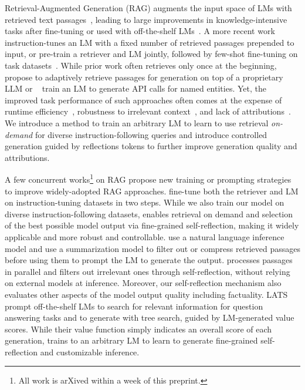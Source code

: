 {
Retrieval-Augmented Generation (RAG) augments the input space of LMs with retrieved text passages~\citep{guu2020retrieval,lewis2020retrieval}, leading to large improvements in knowledge-intensive tasks after fine-tuning or used with off-the-shelf LMs~\citep{ram2023context}. 
A more recent work~\citep{luo2023sail} instruction-tunes an LM with a fixed number of retrieved passages prepended to input, or pre-train a retriever and LM jointly, followed by few-shot fine-tuning on task datasets~\citep{izacard2022few}. }
While prior work often retrieves only once at the beginning, \cite{jiang2023active} propose to
adaptively retrieve passages for generation on top of a proprietary LLM or ~\cite{schick2023toolformer} train an LM to generate API calls for named entities. 
Yet, the improved task performance of such approaches often comes at the expense of runtime efficiency~\citep{mallen2022not}, robustness to irrelevant context~\citep{pmlr-v202-shi23a}, and lack of attributions~\citep{liu2023evaluating,gao2023enabling}. 
We introduce a method to train an arbitrary LM to learn to use retrieval \textit{on-demand} for diverse instruction-following queries and introduce controlled generation guided by reflections tokens to further improve generation quality and attributions. 

{
A few concurrent works\footnote{All work is arXived within a week of this preprint.} on RAG propose new training or prompting strategies to improve widely-adopted RAG approaches. 
\cite{lin2023radit} fine-tune both the retriever and LM on instruction-tuning datasets in two steps.
While we also train our model on diverse instruction-following datasets, \model enables retrieval on demand and selection of the best possible model output via fine-grained self-reflection, making it widely applicable and more robust and controllable. 
\citet{Yoran2023MakingRL} use a natural language inference model and \citet{xu2023recomp} use a summarization model to filter out or compress retrieved passages before using them to prompt the LM to generate the output.
\model processes passages in parallel and filters out irrelevant ones through self-reflection, without relying on external models at inference. Moreover, our self-reflection mechanism also evaluates other aspects of the model output quality including factuality.
LATS~\citep{zhou2023language} prompt off-the-shelf LMs to search for relevant information for question answering tasks and to generate with tree search, guided by LM-generated value scores. 
While their value function simply indicates an overall score of each generation, \model trains to an arbitrary LM to learn to generate fine-grained self-reflection and customizable inference. 
}

